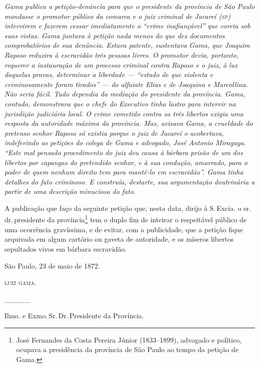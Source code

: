 \begin{didascalia}
\emph{Gama publica a petição-denúncia para que o presidente da província
de São Paulo mandasse o promotor público da comarca e o juiz criminal de
Jacareí (\textsc{sp}) intervirem e fazerem cessar imediatamente o ``crime
inafiançável'' que corria sob suas vistas. Gama juntava à petição nada
menos do que dez documentos comprobatórios de sua denúncia. Estava
patente, sustentava Gama, que Joaquim Raposo reduzira à escravidão três
pessoas livres. O promotor devia, portanto, requerer a instauração de um
processo criminal contra Raposo e o juiz, à luz daquelas provas,
determinar a liberdade --- ``estado de que violenta e criminosamente foram
tirados'' --- do alfaiate Elias e de Joaquina e Marcollina. Não seria
fácil. Tudo dependia da mediação do presidente da província. Gama,
contudo, demonstrava que o chefe do Executivo tinha lastro para intervir
na jurisdição judiciária local. O crime cometido contra os três libertos
exigia uma resposta da autoridade máxima da província. Mas, avisava
Gama, a crueldade do pretenso senhor Raposo só existia porque o juiz de
Jacareí o acobertava, indeferindo as petições do colega de Gama e
advogado, José Antonio Miragaya. ``Este mal pensado procedimento do juiz
deu causa à bárbara prisão de um dos libertos por capangas do pretendido
senhor, e à sua condução, amarrado, para o poder de quem nenhum direito
tem para mantê-lo em escravidão''. Gama tinha detalhes do fato criminoso.
E construía, destarte, sua argumentação doutrinária a partir de uma
descrição minuciosa do fato.}
\end{didascalia}

A publicação que faço da seguinte petição que, nesta data, dirijo à S.\,Excia. o sr.\,dr.\,presidente da província\footnote{ José Fernandes da
  Costa Pereira Júnior (1833--1899), advogado e político, ocupava a
  presidência da província de São Paulo ao tempo da petição de Gama.}
tem o duplo fim de inteirar o respeitável público de uma ocorrência
gravíssima, e de evitar, com a publicidade, que a petição fique
arquivada em algum cartório ou gaveta de autoridade, e os míseros
libertos sepultados vivos em bárbara escravidão.

São Paulo, 23 de maio de 1872.

\textsc{luiz gama}.

\_\_\_\_\_

Ilmo. e Exmo.\,Sr.\,Dr.\,Presidente da Província.

